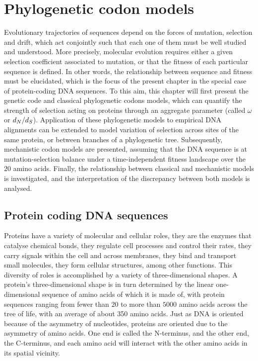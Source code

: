 \chapter{Phylogenetic {codon} models}
{\hypersetup{linkcolor=GREYDARK}\minitoc}
\label{chap:intro-codon-models}
Evolutionary trajectories of sequences depend on the forces of mutation, selection and drift, which act conjointly such that each one of them must be well studied and understood.
More precisely, molecular evolution requires either a given selection coefficient associated to mutation, or that the fitness of each particular sequence is defined.
In other words, the relationship between sequence and fitness must be elucidated, which is the focus of the present chapter in the special case of protein-coding \acrshort{DNA} sequences.
To this aim, this chapter will first present the genetic code and classical phylogenetic \glspl{codon} models, which can quantify the strength of selection acting on proteins through an aggregate parameter (called $\omega$ or $d_N / d_S$).
Application of these phylogenetic models to empirical \acrshort{DNA} alignments can be extended to model variation of selection across sites of the same protein, or between branches of a phylogenetic tree.
Subsequently, mechanistic \gls{codon} models are presented, assuming that the \acrshort{DNA} sequence is at mutation-selection balance under a time-independent fitness landscape over the $20$ amino acids.
Finally, the relationship between classical and mechanistic models is investigated, and the interpretation of the discrepancy between both models is analysed.


\section{Protein coding {DNA} sequences}
\label{sec-intro:genetic-code}
Proteins have a variety of molecular and cellular roles, they are the enzymes that catalyse chemical bonds, they regulate cell processes and control their rates, they carry signals within the cell and across membranes, they bind and transport small molecules, they form cellular structures, among other functions.
This diversity of roles is accomplished by a variety of three-dimensional shapes.
A protein's three-dimensional shape is in turn determined by the linear one-dimensional sequence of amino acids of which it is made of, with protein sequences ranging from fewer than $20$ to more than $5000$ amino acids across the tree of life, with an average of about 350 amino acids.
Just as \acrshort{DNA} is oriented because of the asymmetry of nucleotides, proteins are oriented due to the asymmetry of amino acids.
One end is called the \gls{N-terminus}, and the other end, the C-terminus, and each amino acid will interact with the other amino acids in its spatial vicinity.

